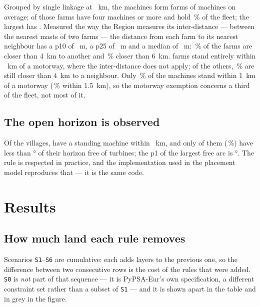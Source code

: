 \documentclass[11pt,a4paper]{article}
\begin{document}
Grouped by single linkage at \FleetFarmLink{}~km, the \FleetN{} machines form
\FleetFarms{} farms of \FleetPerFarm{} machines on average; \FleetFarmsFour{} of
those farms have four machines or more and hold \FleetInBigFarms{}\,\% of the
fleet; the largest has \FleetLargestFarm{}. Measured the way the Region measures
its inter-distance --- between the nearest masts of two farms --- the distance
from each farm to its nearest neighbour has a p10 of \FleetFarmEdgePTen{}~m, a
p25 of \FleetFarmEdgePTwentyFive{}~m and a median of \FleetFarmEdgePFifty{}~m:
\FleetEdgeBelowFour{}\,\% of the farms are closer than 4~km to another and
\FleetEdgeBelowSix{}\,\% closer than 6~km. \FleetMwFarms{} farms stand entirely
within \MotorwayExempt{}~km of a motorway, where the inter-distance does not
apply; of the others, \FleetNonMwEdgeBelowFour{}\,\% are still closer than 4~km
to a neighbour. Only \FleetNearMotorway{}\,\% of the machines stand within
\SI{1}{\kilo\metre} of a motorway (\FleetNearMotorwayWide{}\,\% within
\SI{1.5}{\kilo\metre}), so the motorway exemption concerns a third of the fleet,
not most of it.

\subsection{The open horizon is observed}\label{sec:horizoncheck}

Of the \HorizonSettlements{} villages, \HorizonAffected{} have a standing
machine within \PlaceHorizonRadius{}~km, and only \HorizonFailing{} of them
(\HorizonFailingPct{}\,\%) have less than \PlaceAzimuth{}° of their horizon
free of turbines; the p1 of the largest free arc is \HorizonArcPOne{}°. The rule
is respected in practice, and the implementation used in the placement model
reproduces that --- it is the same code.

\section{Results}

\subsection{How much land each rule removes}

Scenarios \texttt{S1}--\texttt{S6} are cumulative: each adds layers to the
previous one, so the difference between two consecutive rows is the cost of the
rules that were added. \texttt{S0} is \emph{not} part of that sequence --- it is
PyPSA-Eur's own specification, a different constraint set rather than a subset
of \texttt{S1} --- and it is shown apart in the table and in grey in the figure.
\end{document}

